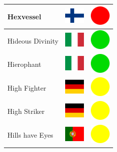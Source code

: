 \documentclass[12pt, a4paper, twoside]{report}
\begin{document}
\begin{center}
\begin{longtable}{|p{5cm}|p{2cm}|p{2cm}|}
 Hexvessel                                                  & \includegraphics[width=1cm]{../img/flags/fi} &   \includegraphics[width=1cm]{../likes/n} \\ \hline
 Hideous Divinity                                           & \includegraphics[width=1cm]{../img/flags/it} &   \includegraphics[width=1cm]{../likes/y} \\ \hline
 Hierophant                                                 & \includegraphics[width=1cm]{../img/flags/it} &   \includegraphics[width=1cm]{../likes/y} \\ \hline
 High Fighter                                               & \includegraphics[width=1cm]{../img/flags/de} &   \includegraphics[width=1cm]{../likes/m} \\ \hline
 High Striker                                               & \includegraphics[width=1cm]{../img/flags/de} &   \includegraphics[width=1cm]{../likes/m} \\ \hline
 Hills have Eyes                                            & \includegraphics[width=1cm]{../img/flags/pt} &   \includegraphics[width=1cm]{../likes/m} \\ \hline

\end{longtable}
\end{center}
\end{document}
